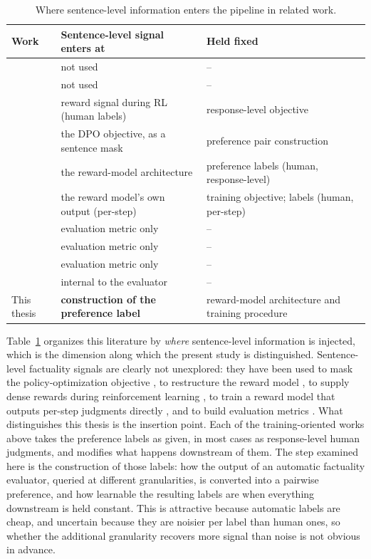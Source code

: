 \begin{table}[htbp]
\centering
\caption[Where sentence-level information enters the pipeline in related work]{Where sentence-level information enters the pipeline in related work.}
\label{tab:rw-gap}
\begin{tabularx}{\textwidth}{lXX}
\toprule
Work & Sentence-level signal enters at & Held fixed \\
\midrule
\citet{stiennon2020learning} & not used & -- \\
\citet{lee2023rlaif}         & not used & -- \\
\citet{wu2023finegrained}    & reward signal during RL (human labels) &
  response-level objective \\
\citet{gu2025maskdpo}        & the DPO objective, as a sentence mask &
  preference pair construction \\
\citet{qiu2025sentencelevel} & the reward-model architecture &
  preference labels (human, response-level) \\
\citet{lightman2023verify}   & the reward model's own output (per-step) &
  training objective; labels (human, per-step) \\
\citet{laban2022summac}      & evaluation metric only & -- \\
\citet{song2024finesure}     & evaluation metric only & -- \\
\citet{min2023factscore}     & evaluation metric only & -- \\
\citet{zha2023alignscore}    & internal to the evaluator & -- \\
\midrule
This thesis & \textbf{construction of the preference label} &
  reward-model architecture and training procedure \\
\bottomrule
\end{tabularx}
\end{table}

Table~\ref{tab:rw-gap} organizes this literature by \emph{where} sentence-level
information is injected, which is the dimension along which the present study is
distinguished. Sentence-level factuality signals are clearly not unexplored: they
have been used to mask the policy-optimization objective
\citep{gu2025maskdpo}, to restructure the reward model
\citep{qiu2025sentencelevel}, to supply dense rewards during reinforcement
learning \citep{wu2023finegrained}, to train a reward model that outputs
per-step judgments directly \citep{lightman2023verify}, and to build
evaluation metrics \citep{laban2022summac, song2024finesure, min2023factscore}.
What distinguishes this thesis is the
insertion point. Each of the training-oriented works above takes the preference
labels as given, in most cases as response-level human judgments, and modifies
what happens downstream of them. The step examined here is the construction of
those labels: how the output of an automatic factuality evaluator, queried at
different granularities, is converted into a pairwise preference, and how
learnable the resulting labels are when everything downstream is held constant.
This is attractive because automatic labels are cheap, and uncertain because they
are noisier per label than human ones, so whether the additional granularity
recovers more signal than noise is not obvious in advance.

